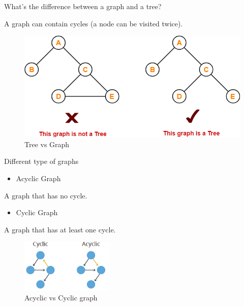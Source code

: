 \documentclass[ignorenonframetext,]{beamer}
\providecommand{\tightlist}{%
  \setlength{\itemsep}{0pt}\setlength{\parskip}{0pt}}
\begin{document}
\begin{frame}{What's the difference between a graph and a tree?}
\protect\hypertarget{whats-the-difference-between-a-graph-and-a-tree}{}

A graph can contain cycles (a node can be visited twice).

\begin{figure}
\centering
\includegraphics[width=\textwidth,height=2.08333in]{Tree-Data-Structure-Example.png}
\caption{Tree vs Graph}
\end{figure}

\end{frame}

\begin{frame}{Different type of graphs}
\protect\hypertarget{different-type-of-graphs}{}

\begin{itemize}
\tightlist
\item
  Acyclic Graph
\end{itemize}

A graph that has no cycle.

\begin{itemize}
\tightlist
\item
  Cyclic Graph
\end{itemize}

A graph that has at least one cycle.

\begin{figure}
\centering
\includegraphics[width=\textwidth,height=1in]{acyclic-cyclic.png}
\caption{Acyclic vs Cyclic graph}
\end{figure}

\end{frame}
\end{document}
